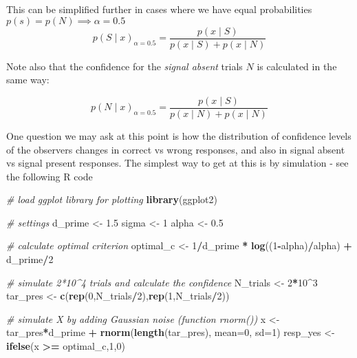 \documentclass[
]{book}
\newenvironment{Shaded}{\begin{snugshade}}{\end{snugshade}}
\newcommand{\AttributeTok}[1]{\textcolor[rgb]{0.13,0.29,0.53}{#1}}
\newcommand{\CommentTok}[1]{\textcolor[rgb]{0.56,0.35,0.01}{\textit{#1}}}
\newcommand{\DecValTok}[1]{\textcolor[rgb]{0.00,0.00,0.81}{#1}}
\newcommand{\FloatTok}[1]{\textcolor[rgb]{0.00,0.00,0.81}{#1}}
\newcommand{\FunctionTok}[1]{\textcolor[rgb]{0.13,0.29,0.53}{\textbf{#1}}}
\newcommand{\NormalTok}[1]{#1}
\newcommand{\OtherTok}[1]{\textcolor[rgb]{0.56,0.35,0.01}{#1}}
\newcommand{\SpecialCharTok}[1]{\textcolor[rgb]{0.81,0.36,0.00}{\textbf{#1}}}
\begin{document}
This can be simplified further in cases where we have equal probabilities \(p(s) = p(N) \implies \alpha=0.5\)
\[
p(S \mid x)_{\alpha=0.5} =  \frac{p(x \mid S)}{p(x \mid S)+p(x \mid N)}
\]

Note also that the confidence for the \emph{signal absent} trials \(N\) is calculated in the same way:

\[
p(N \mid x)_{\alpha=0.5} =  \frac{p(x \mid S)}{p(x \mid N)+p(x \mid N)}
\]

One question we may ask at this point is how the distribution of confidence levels of the observers changes in correct vs wrong responses, and also in signal absent vs signal present responses. The simplest way to get at this is by simulation - see the following R code

\begin{Shaded}
\begin{Highlighting}[]
\CommentTok{\# load ggplot library for plotting}
\FunctionTok{library}\NormalTok{(ggplot2)}

\CommentTok{\# settings}
\NormalTok{d\_prime }\OtherTok{\textless{}{-}} \FloatTok{1.5}
\NormalTok{sigma }\OtherTok{\textless{}{-}} \DecValTok{1}   
\NormalTok{alpha }\OtherTok{\textless{}{-}} \FloatTok{0.5}

\CommentTok{\# calculate optimal criterion}
\NormalTok{optimal\_c }\OtherTok{\textless{}{-}} \DecValTok{1}\SpecialCharTok{/}\NormalTok{d\_prime }\SpecialCharTok{*} \FunctionTok{log}\NormalTok{((}\DecValTok{1}\SpecialCharTok{{-}}\NormalTok{alpha)}\SpecialCharTok{/}\NormalTok{alpha) }\SpecialCharTok{+}\NormalTok{ d\_prime}\SpecialCharTok{/}\DecValTok{2}

\CommentTok{\# simulate 2*10\^{}4 trials and calculate the confidence }
\NormalTok{N\_trials }\OtherTok{\textless{}{-}} \DecValTok{2}\SpecialCharTok{*}\DecValTok{10}\SpecialCharTok{\^{}}\DecValTok{3}
\NormalTok{tar\_pres }\OtherTok{\textless{}{-}} \FunctionTok{c}\NormalTok{(}\FunctionTok{rep}\NormalTok{(}\DecValTok{0}\NormalTok{,N\_trials}\SpecialCharTok{/}\DecValTok{2}\NormalTok{),}\FunctionTok{rep}\NormalTok{(}\DecValTok{1}\NormalTok{,N\_trials}\SpecialCharTok{/}\DecValTok{2}\NormalTok{))}

\CommentTok{\# simulate X by adding Gaussian noise (function rnorm())}
\NormalTok{x }\OtherTok{\textless{}{-}}\NormalTok{ tar\_pres}\SpecialCharTok{*}\NormalTok{d\_prime }\SpecialCharTok{+} \FunctionTok{rnorm}\NormalTok{(}\FunctionTok{length}\NormalTok{(tar\_pres), }\AttributeTok{mean=}\DecValTok{0}\NormalTok{, }\AttributeTok{sd=}\DecValTok{1}\NormalTok{)}
\NormalTok{resp\_yes }\OtherTok{\textless{}{-}} \FunctionTok{ifelse}\NormalTok{(x }\SpecialCharTok{\textgreater{}=}\NormalTok{ optimal\_c,}\DecValTok{1}\NormalTok{,}\DecValTok{0}\NormalTok{)}


\end{Highlighting}
\end{Shaded}
\end{document}
